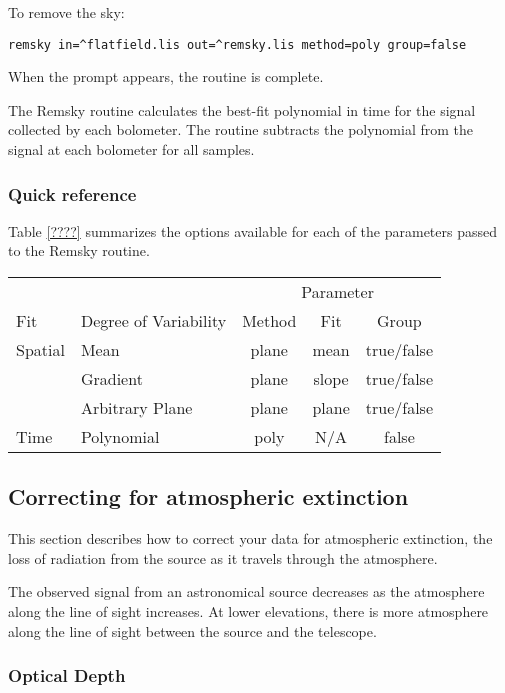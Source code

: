 \documentclass[twoside,11pt]{article}
\renewcommand{\_}{\texttt{\symbol{95}}}
\begin{document}
To remove the sky:
\begin{verbatim}
remsky in=^flatfield.lis out=^remsky.lis method=poly group=false
\end{verbatim}
When the prompt appears, the routine is complete.


The Remsky routine calculates the best-fit polynomial in time for the
signal collected by each bolometer. The routine subtracts the
polynomial from the signal at each bolometer for all samples.

\subsubsection{Quick reference}

Table \ref{????} summarizes the options available for each of the
parameters passed to the Remsky routine.

\begin{table}
\begin{tabular}{llccc}
\hline
        &                        & \multicolumn{3}{c}{Parameter} \\
Fit     & Degree of Variability  & Method  & Fit & Group\\
\hline
Spatial & Mean            & plane & mean  & true/false \\
        & Gradient        & plane & slope & true/false \\
        & Arbitrary Plane & plane & plane & true/false \\
Time    & Polynomial      & poly  & N/A   &    false \\
\hline
\end{tabular}
\end{table}

\subsection{Correcting for atmospheric extinction}

This section describes how to correct your data for atmospheric
extinction, the loss of radiation from the source as it travels
through the atmosphere.

The observed signal from an astronomical source decreases as the
atmosphere along the line of sight increases. At lower elevations,
there is more atmosphere along the line of sight between the source
and the telescope.

\subsubsection{Optical Depth}
\end{document}
